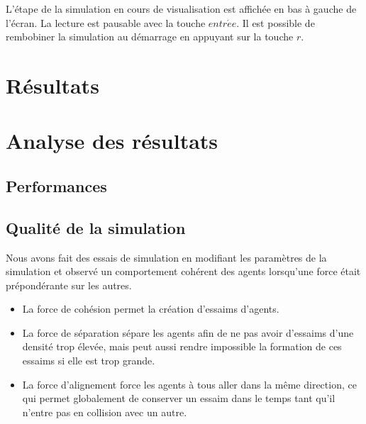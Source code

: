 \documentclass[12pt,a4paper,sans]{article}
\begin{document}
L'étape de la simulation en cours de visualisation est affichée en bas à gauche de l'écran. La lecture est pausable avec la touche $entr\acute{e}e$. Il est possible de rembobiner la simulation au démarrage en appuyant sur la touche $r$.



\section{Résultats}




\section{Analyse des résultats}

\subsection{Performances}

\subsection{Qualité de la simulation}
Nous avons fait des essais de simulation en modifiant les paramètres de la simulation et observé un comportement cohérent des agents lorsqu'une force était prépondérante sur les autres.
\begin{itemize}
    \item La force de cohésion permet la création d'essaims d'agents.
    \item La force de séparation sépare les agents afin de ne pas avoir d'essaims d'une densité trop élevée, mais peut aussi rendre impossible la formation de ces essaims si elle est trop grande.
    \item La force d'alignement force les agents à tous aller dans la même direction, ce qui permet globalement de conserver un essaim dans le temps tant qu'il n'entre pas en collision avec un autre.
\end{itemize}
\end{document}
